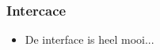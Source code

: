 \begin{frame}\frametitle{Intercace}
\begin{itemize}
    \item De interface is heel mooi...
\end{itemize}
\end{frame}
